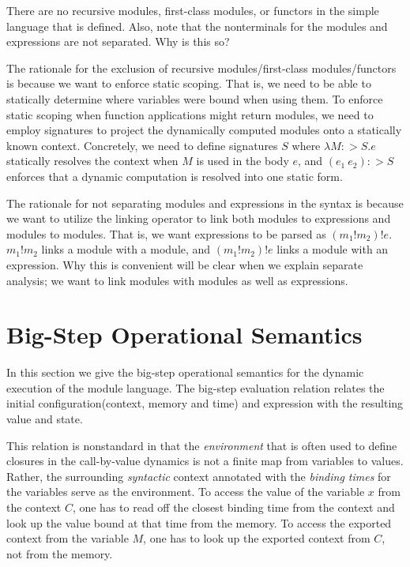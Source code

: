 \documentclass[acmsmall,screen]{acmart}
\theoremstyle{definition}
\newcommand*{\link}[2]{{#1}\mathtt{!}{#2}}
\begin{document}
There are no recursive modules, first-class modules, or functors in the simple language that is defined.
Also, note that the nonterminals for the modules and expressions are not separated. Why is this so?

The rationale for the exclusion of recursive modules/first-class modules/functors is because we want to enforce static scoping.
That is, we need to be able to statically determine where variables were bound when using them.
To enforce static scoping when function applications might return modules, we need to employ signatures to project the dynamically computed modules onto a statically known context.
Concretely, we need to define signatures $S$ where $\lambda M:>S.e$ statically resolves the context when $M$ is used in the body $e$, and $(e_1\:e_2):>S$ enforces that a dynamic computation is resolved into one static form.

The rationale for not separating modules and expressions in the syntax is because we want to utilize the linking operator to link both modules to expressions and modules to modules.
That is, we want expressions to be parsed as $(m_1!m_2)!e$.
$\link{m_1}{m_2}$ links a module with a module, and $(m_1!m_2)!e$ links a module with an expression.
Why this is convenient will be clear when we explain separate analysis; we want to link modules with modules as well as expressions.

\section{Big-Step Operational Semantics}

In this section we give the big-step operational semantics for the dynamic execution of the module language.
The big-step evaluation relation relates the initial configuration(context, memory and time) and expression with the resulting value and state.

This relation is nonstandard in that the \emph{environment} that is often used to define closures in the call-by-value dynamics is not a finite map from variables to values.
Rather, the surrounding \emph{syntactic} context annotated with the \emph{binding times} for the variables serve as the environment.
To access the value of the variable $x$ from the context $C$, one has to read off the closest binding time from the context and look up the value bound at that time from the memory.
To access the exported context from the variable $M$, one has to look up the exported context from $C$, not from the memory.
\end{document}
